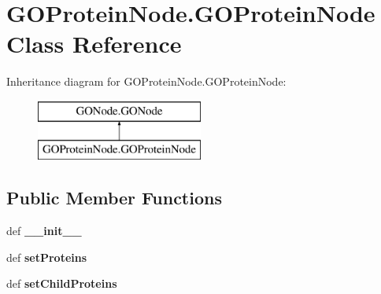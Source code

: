 \hypertarget{class_g_o_protein_node_1_1_g_o_protein_node}{
\section{GOProteinNode.GOProteinNode Class Reference}
\label{class_g_o_protein_node_1_1_g_o_protein_node}
}
Inheritance diagram for GOProteinNode.GOProteinNode:\begin{figure}[H]
\begin{center}
\leavevmode
\includegraphics[height=2.000000cm]{class_g_o_protein_node_1_1_g_o_protein_node}
\end{center}
\end{figure}
\subsection*{Public Member Functions}
\begin{DoxyCompactItemize}
\item 
\hypertarget{class_g_o_protein_node_1_1_g_o_protein_node_a139cd6e13cfed5024d81039ad71509a6}{
def {\bfseries \_\-\_\-init\_\-\_\-}}
\label{class_g_o_protein_node_1_1_g_o_protein_node_a139cd6e13cfed5024d81039ad71509a6}

\item 
\hypertarget{class_g_o_protein_node_1_1_g_o_protein_node_a30faecd59dfe78a20ecd617045732700}{
def {\bfseries setProteins}}
\label{class_g_o_protein_node_1_1_g_o_protein_node_a30faecd59dfe78a20ecd617045732700}

\item 
\hypertarget{class_g_o_protein_node_1_1_g_o_protein_node_a5305149f9d2260bf90aa70c81a8bc14b}{
def {\bfseries setChildProteins}}
\label{class_g_o_protein_node_1_1_g_o_protein_node_a5305149f9d2260bf90aa70c81a8bc14b}

\end{DoxyCompactItemize}
